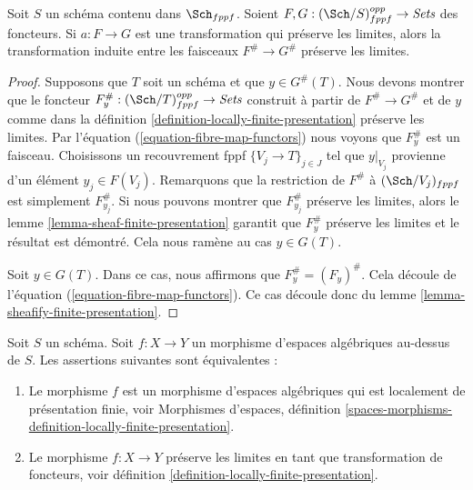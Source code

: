 \begin{lemma}
\label{lemma-sheafify-finite-presentation-map}
Soit $S$ un schéma contenu dans $\Sch_{fppf}$.
Soient $F, G : (\Sch/S)_{fppf}^{opp} \to \textit{Sets}$ des foncteurs.
Si $a : F \to G$ est une transformation qui préserve les limites,
alors la transformation induite entre les faisceaux
$F^\# \to G^\#$ préserve les limites.
\end{lemma}

\begin{proof}
Supposons que $T$ soit un schéma et que $y \in G^\#(T)$.
Nous devons montrer que le foncteur
$F^\#_y : (\Sch/T)_{fppf}^{opp} \to \textit{Sets}$
construit à partir de $F^\# \to G^\#$ et de $y$ comme dans
la définition \ref{definition-locally-finite-presentation}
préserve les limites.
Par l'équation (\ref{equation-fibre-map-functors})
nous voyons que $F^\#_y$ est un faisceau. Choisissons un recouvrement fppf
$\{V_j \to T\}_{j \in J}$ tel que $y|_{V_j}$ provienne
d'un élément $y_j \in F(V_j)$.
Remarquons que la restriction de $F^\#$ à $(\Sch/V_j)_{fppf}$
est simplement $F^\#_{y_j}$. Si nous pouvons montrer que $F^\#_{y_j}$
préserve les limites, alors
le lemme \ref{lemma-sheaf-finite-presentation}
garantit que $F^\#_y$ préserve les limites et
le résultat est démontré. Cela nous ramène au cas $y \in G(T)$.

\medskip\noindent
Soit $y \in G(T)$. Dans ce cas, nous affirmons que $F^\#_y = (F_y)^\#$.
Cela découle de
l'équation (\ref{equation-fibre-map-functors}).
Ce cas découle donc du
lemme \ref{lemma-sheafify-finite-presentation}.
\end{proof}

\begin{proposition}
\label{proposition-characterize-locally-finite-presentation}
Soit $S$ un schéma. Soit $f : X \to Y$ un morphisme d'espaces algébriques
au-dessus de $S$. Les assertions suivantes sont équivalentes :
\begin{enumerate}
\item Le morphisme $f$ est un morphisme d'espaces algébriques qui est
localement de présentation finie, voir
Morphismes d'espaces,
définition \ref{spaces-morphisms-definition-locally-finite-presentation}.
\item Le morphisme $f : X \to Y$ préserve les limites en tant que
transformation de foncteurs, voir
définition \ref{definition-locally-finite-presentation}.
\end{enumerate}
\end{proposition}

